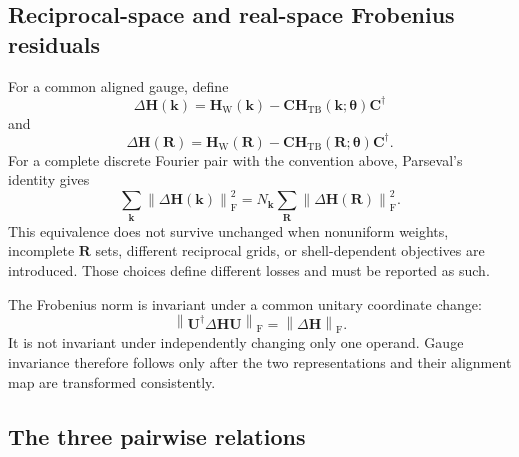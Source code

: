 \subsection{Reciprocal-space and real-space Frobenius residuals}


For a common aligned gauge, define
\begin{equation}
    \Delta\mathbf H(\mathbf k)
    =
    \mathbf H_{\mathrm W}(\mathbf k)
    -
    \mathbf C
    \mathbf H_{\mathrm{TB}}(\mathbf k;\boldsymbol\theta)
    \mathbf C^\dagger
\end{equation}
and
\begin{equation}
    \Delta\mathbf H(\mathbf R)
    =
    \mathbf H_{\mathrm W}(\mathbf R)
    -
    \mathbf C
    \mathbf H_{\mathrm{TB}}(\mathbf R;\boldsymbol\theta)
    \mathbf C^\dagger.
\end{equation}
For a complete discrete Fourier pair with the convention above, Parseval's
identity gives
\begin{equation}
    \sum_{\mathbf k}
    \left\lVert
        \Delta\mathbf H(\mathbf k)
    \right\rVert_{\mathrm F}^2
    =
    N_{\mathbf k}
    \sum_{\mathbf R}
    \left\lVert
        \Delta\mathbf H(\mathbf R)
    \right\rVert_{\mathrm F}^2.
\end{equation}
This equivalence does not survive unchanged when nonuniform weights, incomplete
$\mathbf R$ sets, different reciprocal grids, or shell-dependent objectives
are introduced. Those choices define different losses and must be reported as
such.

The Frobenius norm is invariant under a common unitary coordinate change:
\begin{equation}
    \left\lVert
        \mathbf U^\dagger
        \Delta\mathbf H
        \mathbf U
    \right\rVert_{\mathrm F}
    =
    \left\lVert
        \Delta\mathbf H
    \right\rVert_{\mathrm F}.
\end{equation}
It is not invariant under independently changing only one operand. Gauge
invariance therefore follows only after the two representations and their
alignment map are transformed consistently.

\subsection{The three pairwise relations}

